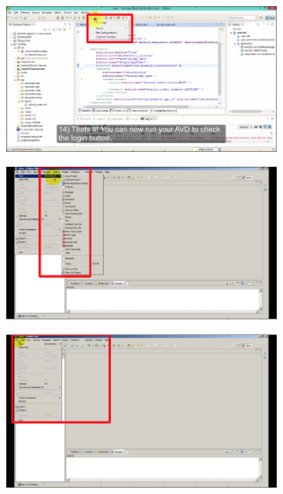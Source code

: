 \documentclass[10pt]{article}
\begin{document}
\begin{figure}
\begin{subfigure}{0.15\textwidth}
        \caption{}
        \label{fig:proposal3}
        \vspace*{2mm}
    \end{subfigure}
    \begin{subfigure}{0.15\textwidth}
        \includegraphics[width=\textwidth]{fig/proposal4}
        \caption{}
        \label{fig:proposal4}
        \vspace*{2mm}
    \end{subfigure}
    \begin{subfigure}{0.15\textwidth}
        \includegraphics[width=\textwidth]{fig/proposal5}
        \caption{}
        \label{fig:proposal5}
        \vspace*{2mm}
    \end{subfigure}
    \begin{subfigure}{0.15\textwidth}
        \includegraphics[width=\textwidth]{fig/proposal6}
        \caption{}
        \label{fig:proposal6}
        \vspace*{2mm}
    \end{subfigure}
\end{figure}
\end{document}
